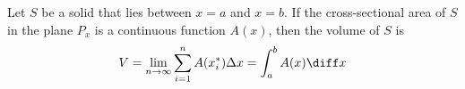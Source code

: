 \begin{frame}
\begin{definition}[Volume]
Let $S$ be a solid that lies between $x = a$ and $x = b$.  If the cross-sectional area of $S$ in the plane $P_x$ is a continuous function $A(x)$, then the volume of $S$ is
\[
V = \lim_{n\to\infty} \sum_{i=1}^n A(x_i^*)\Delta x = \int_a^b A(x)\diff x%
\]
\end{definition}
\end{frame}
